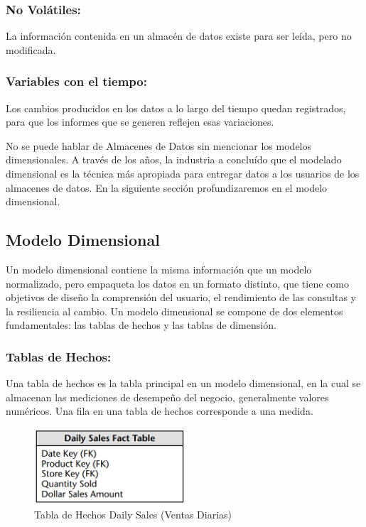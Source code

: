 \subsubsection{No Vol\'atiles:}
La información contenida en un almac\'en de datos existe para ser leída, pero no modificada.

\subsubsection{Variables con el tiempo:}
Los cambios producidos en los datos a lo largo del tiempo quedan registrados, para que los informes que se generen reflejen 
esas variaciones.


No se puede hablar de Almacenes de Datos sin mencionar los modelos dimensionales. A trav\'es de los a\~{n}os, la industria 
a conclu\'ido que el modelado dimensional es la t\'ecnica m\'as apropiada para entregar datos a los usuarios de los 
almacenes de datos. En la siguiente sección profundizaremos en el modelo dimensional.

\subsection{Modelo Dimensional}

Un modelo dimensional contiene la misma información que un modelo normalizado, pero empaqueta los datos en un formato 
distinto, que tiene como objetivos de diseño la comprensión del usuario, el rendimiento de las consultas y la resiliencia 
al cambio. Un modelo dimensional se compone de dos elementos fundamentales: las tablas de hechos y las tablas de dimensi\'on.
%
\subsubsection{Tablas de Hechos: }
%
Una tabla de hechos es la tabla principal en un modelo dimensional, en la cual se almacenan las mediciones de desempeño del 
negocio, generalmente valores num\'ericos\cite{kimball2011data}. Una fila en una tabla de hechos corresponde a una medida.
%
\begin{figure}[ht]
    \centering
    \includegraphics[width=0.5\textwidth]{../document/Graphics/hechos.png}
    \caption{Tabla de Hechos Daily Sales (Ventas Diarias) \cite{kimball2011data}}
    \label{fig:facts}
  \end{figure}
%

